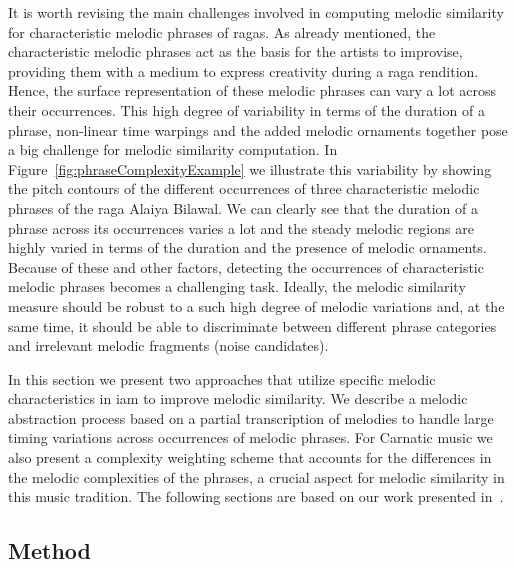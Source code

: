 It is worth revising the main challenges involved in computing melodic similarity for characteristic melodic phrases of \glspl{raga}. As already mentioned, the characteristic melodic phrases act as the basis for the artists to improvise, providing them with a medium to express creativity during a \gls{raga} rendition. Hence, the surface representation of these melodic phrases can vary a lot across their occurrences. This high degree of variability in terms of the duration of a phrase, non-linear time warpings and the added melodic ornaments together pose a big challenge for melodic similarity computation. In Figure~\ref{fig:phraseComplexityExample} we illustrate this variability by showing the pitch contours of the different occurrences of three characteristic melodic phrases of the \gls{raga} Alaiya Bilawal. We can clearly see that the duration of a phrase across its occurrences varies a lot and the steady melodic regions are highly varied in terms of the duration and the presence of melodic ornaments. Because of these and other factors, detecting the occurrences of characteristic melodic phrases becomes a challenging task. Ideally, the melodic similarity measure should be robust to a such high degree of melodic variations and, at the same time, it should be able to discriminate between different phrase categories and irrelevant melodic fragments (noise candidates).

In this section we present two approaches that utilize specific melodic characteristics in \gls{iam} to improve melodic similarity. We describe a melodic abstraction process based on a partial transcription of melodies to handle large timing variations across occurrences of melodic phrases. For Carnatic music we also present a complexity weighting scheme that accounts for the differences in the melodic complexities of the phrases, a crucial aspect for melodic similarity in this music tradition. The following sections are based on our work presented in~\cite{gulati_ISMIR_2015}.



\subsection{Method}
\label{sec:patterns_improving_similarity_method}

